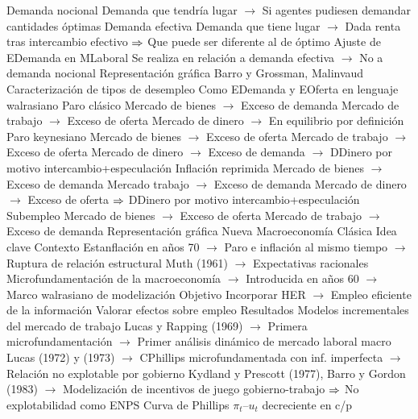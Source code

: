 \documentclass{nuevotema}
\begin{document}
\begin{esquemal}
				\4 Demanda nocional
				\4[] Demanda que tendría lugar
				\4[] $\to$ Si agentes pudiesen demandar cantidades óptimas
				\4 Demanda efectiva
				\4[] Demanda que tiene lugar
				\4[] $\to$ Dada renta tras intercambio efectivo
				\4[] $\then$ Que puede ser diferente al de óptimo
				\4 Ajuste de EDemanda en MLaboral
				\4[] Se realiza en relación a demanda efectiva
				\4[] $\to$ No a demanda nocional
				\4 Representación gráfica
				\4[] 
			\3 Barro y Grossman, Malinvaud
				\4 Caracterización de tipos de desempleo
				\4[] Como EDemanda y EOferta en lenguaje walrasiano
				\4 Paro clásico
				\4[] Mercado de bienes
				\4[] $\to$ Exceso de demanda
				\4[] Mercado de trabajo
				\4[] $\to$ Exceso de oferta
				\4[] Mercado de dinero
				\4[] $\to$ En equilibrio por definición
				\4 Paro keynesiano
				\4[] Mercado de bienes
				\4[] $\to$ Exceso de oferta
				\4[] Mercado de trabajo
				\4[] $\to$ Exceso de oferta
				\4[] Mercado de dinero
				\4[] $\to$ Exceso de demanda
				\4[] $\to$ DDinero por motivo intercambio+especulación
				\4 Inflación reprimida
				\4[] Mercado de bienes
				\4[] $\to$ Exceso de demanda
				\4[] Mercado trabajo
				\4[] $\to$ Exceso de demanda
				\4[] Mercado de dinero
				\4[] $\to$ Exceso de oferta
				\4[] $\then$ DDinero por motivo intercambio+especulación
				\4 Subempleo
				\4[] Mercado de bienes
				\4[] $\to$ Exceso de oferta
				\4[] Mercado de trabajo
				\4[] $\to$ Exceso de demanda
				\4 Representación gráfica
				\4[] 
		\2 Nueva Macroeconomía Clásica
			\3 Idea clave
				\4 Contexto
				\4[] Estanflación en años 70
				\4[] $\to$ Paro e inflación al mismo tiempo
				\4[] $\to$ Ruptura de relación estructural
				\4[] Muth (1961)
				\4[] $\to$ Expectativas racionales
				\4[] Microfundamentación de la macroeconomía
				\4[] $\to$ Introducida en años 60
				\4[] $\to$ Marco walrasiano de modelización
				\4 Objetivo
				\4[] Incorporar HER
				\4[] $\to$ Empleo eficiente de la información
				\4[] Valorar efectos sobre empleo
				\4 Resultados
				\4[] Modelos incrementales del mercado de trabajo
				\4[] Lucas y Rapping (1969)
				\4[] $\to$ Primera microfundamentación
				\4[] $\to$ Primer análisis dinámico de mercado laboral macro
				\4[] Lucas (1972) y (1973)
				\4[] $\to$ CPhillips microfundamentada con inf. imperfecta
				\4[] $\to$ Relación no explotable por gobierno
				\4[] Kydland y Prescott (1977), Barro y Gordon (1983)
				\4[] $\to$ Modelización de incentivos de juego gobierno-trabajo
				\4[] $\then$ No explotabilidad como ENPS
				\4[$\then$] Curva de Phillips $\pi_t$--$u_t$ decreciente en c/p

\end{esquemal}
\end{document}
